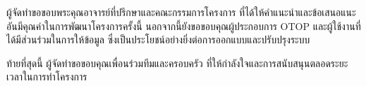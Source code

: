 \begin{acknowledgments}
\par
ผู้จัดทำขอขอบพระคุณอาจารย์ที่ปรึกษาและคณะกรรมการโครงการ 
ที่ได้ให้คำแนะนำและข้อเสนอแนะอันมีคุณค่าในการพัฒนาโครงการครั้งนี้  
นอกจากนี้ยังขอขอบคุณผู้ประกอบการ OTOP และผู้ใช้งานที่ได้มีส่วนร่วมในการให้ข้อมูล 
ซึ่งเป็นประโยชน์อย่างยิ่งต่อการออกแบบและปรับปรุงระบบ  

ท้ายที่สุดนี้ ผู้จัดทำขอขอบคุณเพื่อนร่วมทีมและครอบครัว 
ที่ให้กำลังใจและการสนับสนุนตลอดระยะเวลาในการทำโครงการ
\end{acknowledgments}
\fi %

\contentspage

\ifproject
\figurelistpage

\tablelistpage
\fi %




